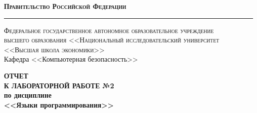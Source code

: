 \documentclass[a4paper, 12pt]{article}
\begin{document}
\begin{titlepage}

\begin{center}
{\textsc{\textbf{Правительство Российской Федерации}}}\\
\vspace{0.5cm}
\hrule
\vspace{0.5cm}
{\textsc{Федеральное государственное автономное образовательное учреждение\\высшего образования <<Национальный исследовательский университет\\<<Высшая школа экономики>>}}\\
\vspace{1cm}
Кафедра <<Компьютерная безопасность>>
\end{center}

\vspace{\fill}

\begin{center}
{\Large{\textbf{ОТЧЕТ \\ К ЛАБОРАТОРНОЙ РАБОТЕ №2}}} \\
\vspace{1em}
{\textbf{по дисциплине}} \\
\vspace{1em}
{\large{\textbf{<<Языки программирования>>}}}
\end{center}

\vspace{\fill}


\begin{flushright}
  \begin{minipage}[center]{15cm}


\end{minipage}
\end{flushright}
\end{titlepage}
\end{document}
